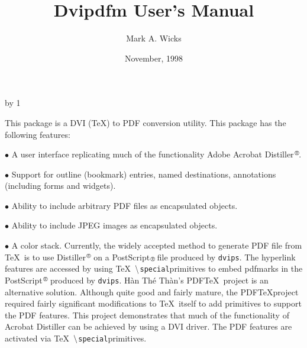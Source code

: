 %
\def\section#1{\advance\sectioncount by 1\ssectioncount0
\goodbreak\vskip1.5\baselineskip\noindent\setheading{\the\sectioncount. #1}\par\nobreak\medskip}%
\def\subsection#1{\advance\ssectioncount by 1%
\bigskip\indent\setsubheading{\the\sectioncount.\the\ssectioncount\
          #1}\par\nobreak\medskip}%
%
\def\display#1{\medskip\line{\quad #1\hfil}\medskip}
\def\example#1{\noindent{\it Example:\par\nobreak\noindent}}
%
\def\newpage{\vfill\eject}
%
\def\dvipdfm{{\tt dvipdfm}}%

\def\ttspecial{$\tt\backslash${\tt special}}%
%
\title{Dvipdfm User's Manual}
\author{Mark A. Wicks}
\date{November, 1998}
\maketitle
\section{Introduction}
This package is a DVI (\TeX) to PDF conversion utility.
This package has the following features:

\beginlist
\item{$\bullet$} A user interface replicating much of the
functionality Adobe Acrobat Distiller$^\rtm$.

\item{$\bullet$} Support for outline (bookmark) entries, named destinations,
annotations (including forms and widgets).

\item{$\bullet$} Ability to include arbitrary PDF files as encapsulated
objects.

\item{$\bullet$} Ability to include JPEG images as encapsulated
objects.

\item{$\bullet$} A color stack.
\endlist
Currently, the widely accepted method to generate PDF file from \TeX\
is to use Distiller$^\rtm$ on a PostScript${\rtm}$
file produced by {\tt dvips}.
The hyperlink features are accessed by using \TeX\ \ttspecial primitives
to embed pdfmarks in the PostScript$^\rtm$ produced by {\tt dvips}.
H\`an Th\'e Th\`an's PDF\TeX\ project is an alternative solution.
Although quite good and fairly mature, the PDF\TeX project required
fairly significant modifications to
\TeX\ itself to add primitives to support the PDF features.
This project demonstrates that much of the functionality
of Acrobat Distiller can be achieved by using a DVI driver.
The PDF features are activated via \TeX\ \ttspecial primitives.

